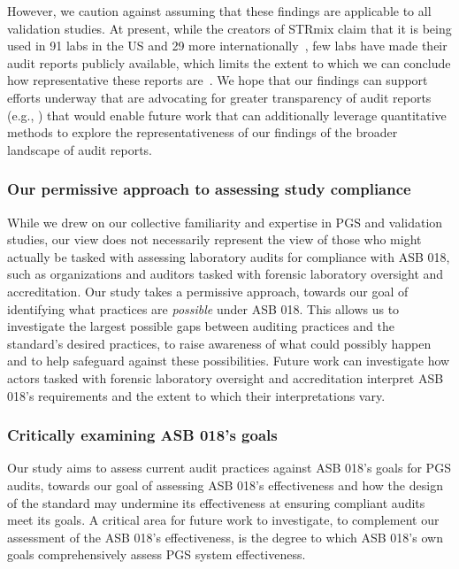 However, we caution against assuming that these findings are applicable to all validation studies. At present, while the creators of STRmix claim that it is being used in 91 labs in the US and 29 more internationally~\cite{strmix2025use}, few labs have made their audit reports publicly available, which limits the extent to which we can conclude how representative these reports are~\cite{butler2024dna}. We hope that our findings can support efforts underway that are advocating for greater transparency of audit reports (e.g., \cite{canellas2021defending, butler2024dna, abebe2022adversarial, jin2024beyond, krane2022using, matthews2019right, matthews2020trusted, kinshipproblem}) that would enable future work that can additionally leverage quantitative methods to explore the representativeness of our findings of the broader landscape of audit reports. 


\subsubsection{Our permissive approach to assessing study compliance}  
While we drew on our collective familiarity and expertise in PGS and validation studies, our view does not necessarily represent the view of those who might actually be tasked with assessing laboratory audits for compliance with ASB 018, such as organizations and auditors tasked with forensic laboratory oversight and accreditation. Our study takes a permissive approach, towards our goal of identifying what practices are \textit{possible} under ASB 018. This allows us to investigate the largest possible gaps between auditing practices and the standard’s desired practices, to raise awareness of what could possibly happen and to help safeguard against these possibilities. Future work can investigate how actors tasked with forensic laboratory oversight and accreditation interpret ASB 018's requirements and the extent to which their interpretations vary.


\subsubsection{Critically examining ASB 018's goals} 
Our study aims to assess current audit practices against ASB 018's goals for PGS audits, towards our goal of assessing ASB 018's effectiveness and how the design of the standard may undermine its effectiveness at ensuring compliant audits meet its goals. A critical area for future work to investigate, to complement our assessment of the ASB 018's effectiveness, is the degree to which ASB 018's own goals comprehensively assess PGS system effectiveness. 

